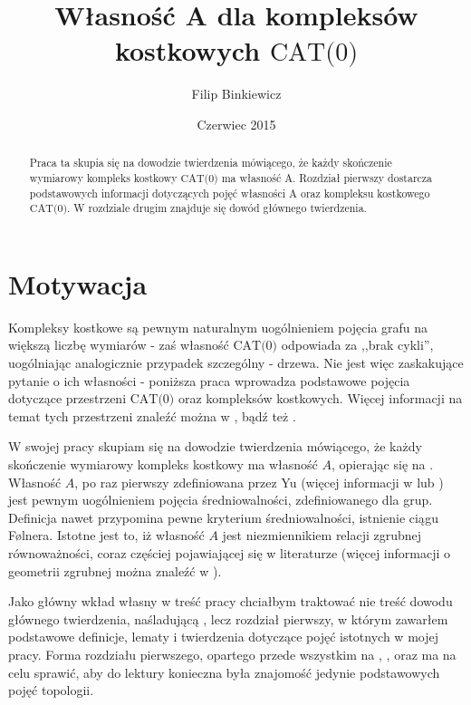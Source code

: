 \documentclass[licencjacka]{pracamgr}
\author{Filip Binkiewicz}
\title{Własność A dla kompleksów kostkowych $\text{CAT(0)}$}
\date{Czerwiec 2015}
\theoremstyle{definition}
\theoremstyle{definition}
\theoremstyle{definition}
\theoremstyle{definition}
\theoremstyle{definition}
\theoremstyle{plain}
\theoremstyle{plain}
\begin{document}
\maketitle


\begin{abstract}
	Praca ta skupia się na dowodzie twierdzenia mówiącego, że każdy skończenie wymiarowy 
	kompleks kostkowy $ \text{CAT(0)} $ ma własność A. Rozdział pierwszy dostarcza 
	podstawowych informacji dotyczących pojęć własności A oraz kompleksu kostkowego 
	$ \text{CAT(0)} $. W rozdziale drugim znajduje się dowód głównego twierdzenia.
\end{abstract}

\tableofcontents

\chapter*{Motywacja}

Kompleksy kostkowe są pewnym naturalnym uogólnieniem pojęcia grafu na większą liczbę 
wymiarów - zaś własność $ \text{CAT(0)} $ odpowiada za ,,brak cykli'', uogólniając 
analogicznie przypadek szczególny - drzewa. Nie jest 
więc zaskakujące pytanie o ich własności - poniższa praca wprowadza podstawowe 
pojęcia dotyczące przestrzeni $ \text{CAT(0)} $ oraz kompleksów kostkowych. 
Więcej informacji na temat tych przestrzeni znaleźć można w 
\cite{caprace}, \cite{schwer} bądź też \cite{sageev}.

W swojej pracy skupiam się na dowodzie twierdzenia mówiącego, że każdy skończenie 
wymiarowy kompleks kostkowy ma własność $ A $, opierając się na \cite{brodzki}. Własność $ A $, 
po raz pierwszy zdefiniowana przez Yu (więcej informacji w \cite{willett} lub 
\cite{nowak}) 
jest pewnym uogólnieniem pojęcia średniowalności, zdefiniowanego dla grup. Definicja nawet 
przypomina pewne kryterium średniowalności, istnienie 
ciągu Følnera. Istotne jest to, iż własność $ A $ jest niezmiennikiem relacji 
zgrubnej równoważności, coraz częściej pojawiającej się w literaturze (więcej informacji 
o geometrii zgrubnej można znaleźć w \cite{roe}).

Jako główny wkład własny w treść pracy chciałbym traktować nie treść dowodu głównego 
twierdzenia, naśladującą \cite{brodzki}, lecz rozdział pierwszy, w którym zawarłem 
podstawowe definicje, lematy i twierdzenia dotyczące pojęć istotnych w mojej pracy. Forma 
rozdziału pierwszego, opartego przede wszystkim na \cite{schwer}, \cite{caprace}, 
\cite{willett} oraz \cite{nowak} ma na celu sprawić, aby do lektury konieczna była 
znajomość jedynie podstawowych pojęć topologii.
\end{document}
